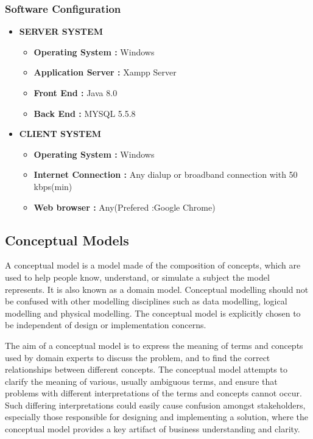 \subsubsection{Software Configuration}
\begin{itemize}
\item {\bf SERVER SYSTEM}
\begin{itemize}
\item {\bf Operating System :} Windows
\item {\bf Application Server :} Xampp Server
\item {\bf Front End :} Java 8.0
\item {\bf Back End :} MYSQL 5.5.8
\end{itemize}
\item {\bf CLIENT SYSTEM}
\begin{itemize}
\item {\bf Operating System :} Windows
\item {\bf Internet Connection :} Any dialup or broadband connection with 50 kbps(min) 
\item {\bf Web browser :} Any(Prefered :Google Chrome)
\end{itemize}
\end{itemize} 
%


%
\subsection{Conceptual Models}
A conceptual model is a model made of the composition of concepts, which are used to help people know, understand, or simulate a subject the model represents.  It is also known as a domain model. Conceptual modelling should not be confused with other modelling disciplines such as data modelling, logical modelling and physical modelling. The conceptual model is explicitly chosen to be independent of design or implementation concerns.   

The aim of a conceptual model is to express the meaning of terms and concepts used by domain experts to discuss the problem, and to find the correct relationships between different concepts. The conceptual model attempts to clarify the meaning of various, usually ambiguous terms, and ensure that problems with different interpretations of the terms and concepts cannot occur. Such differing interpretations could easily cause confusion amongst stakeholders, especially those responsible for designing and implementing a solution, where the conceptual model provides a key artifact of business understanding and clarity. 
%

